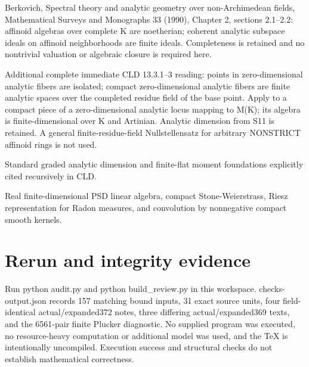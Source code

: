 \documentclass[11pt]{article}
\begin{document}
Berkovich, Spectral theory and analytic geometry over non-Archimedean fields, Mathematical Surveys and Monographs 33 (1990), Chapter 2, sections 2.1--2.2: affinoid algebras over complete K are noetherian; coherent analytic subspace ideals on affinoid neighborhoods are finite ideals. Completeness is retained and no nontrivial valuation or algebraic closure is required here.

Additional complete immediate CLD 13.3.1--3 reading: points in zero-dimensional analytic fibers are isolated; compact zero-dimensional analytic fibers are finite analytic spaces over the completed residue field of the base point. Apply to a compact piece of a zero-dimensional analytic locus mapping to M(K); its algebra is finite-dimensional over K and Artinian. Analytic dimension from S11 is retained. A general finite-residue-field Nullstellensatz for arbitrary NONSTRICT affinoid rings is not used.

Standard graded analytic dimension and finite-flat moment foundations explicitly cited recursively in CLD.

Real finite-dimensional PSD linear algebra, compact Stone-Weierstrass, Riesz representation for Radon measures, and convolution by nonnegative compact smooth kernels.

\section{Rerun and integrity evidence}

Run python audit.py and python build\_review.py in this workspace. checks-output.json records 157 matching bound inputs, 31 exact source units, four field-identical actual/expanded372 notes, three differing actual/expanded369 texts, and the 6561-pair finite Plucker diagnostic. No supplied program was executed, no resource-heavy computation or additional model was used, and the TeX is intentionally uncompiled. Execution success and structural checks do not establish mathematical correctness.
\end{document}
